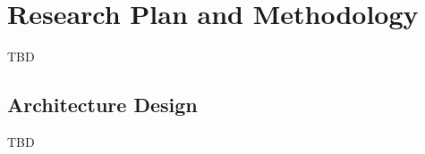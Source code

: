 \section{Research Plan and Methodology} \label{sec:rep}

TBD

\subsection{\xxx Architecture Design} \label{sec:rep-arch}

TBD



